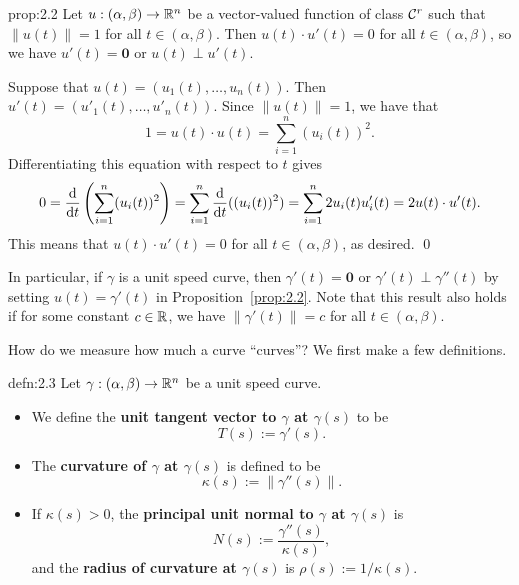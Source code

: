 \begin{prop}{prop:2.2}
    Let $u : (\alpha, \beta) \to \mathbb{R}^n$ be a vector-valued function of class ${\cal C}^r$ 
    such that $\|u(t)\| = 1$ for all $t \in (\alpha, \beta)$. Then 
    $u(t) \cdot u'(t) = 0$ for all $t \in (\alpha, \beta)$, so
    we have $u'(t) = \mathbf 0$ or $u(t) \perp u'(t)$.
\end{prop}\vspace{-0.25cm} 
\begin{pf}
    Suppose that $u(t) = (u_1(t), \dots, u_n(t))$. Then 
    $u'(t) = (u'_1(t), \dots, u'_n(t))$. Since $\|u(t)\| = 1$, we have that 
    \[ 1 = u(t) \cdot u(t) = \sum_{i=1}^n (u_i(t))^2. \]
    Differentiating this equation with respect to $t$ gives 
    \begin{align*}
        0 = \frac{\rm d}{{\rm d}t} \left( \sum_{i=1}^n (u_i(t))^2 \right)
        = \sum_{i=1}^n \frac{\rm d}{{\rm d}t} ((u_i(t))^2) 
        = \sum_{i=1}^n 2u_i(t)u'_i(t) = 2u(t) \cdot u'(t). 
    \end{align*}
    This means that $u(t) \cdot u'(t) = 0$ for all $t \in (\alpha, \beta)$, 
    as desired. \qed 
\end{pf}\vspace{-0.25cm} 

In particular, if $\gamma$ is a unit speed curve, then $\gamma'(t) = \mathbf 0$ 
or $\gamma'(t) \perp \gamma''(t)$ by setting $u(t) = \gamma'(t)$ in 
Proposition~\ref{prop:2.2}. Note that this result also holds if for 
some constant $c \in \mathbb{R}$, we have $\|\gamma'(t)\| = c$ for all $t \in (\alpha, \beta)$.

How do we measure how much a curve ``curves''? We first make a few definitions.

\begin{defn}{defn:2.3}
    Let $\gamma : (\alpha, \beta) \to \mathbb{R}^n$ be a unit speed curve. 
    \begin{itemize}
        \item We define the {\bf unit tangent vector to $\gamma$ at $\gamma(s)$} 
        to be 
        \[ T(s) := \gamma'(s). \] 
        \item The {\bf curvature of $\gamma$ at $\gamma(s)$} is defined to be 
        \[ \kappa(s) := \|\gamma''(s)\|. \] 
        \item If $\kappa(s) > 0$, the {\bf principal unit normal to $\gamma$ 
        at $\gamma(s)$} is 
        \[ N(s) := \frac{\gamma''(s)}{\kappa(s)}, \] 
        and the {\bf radius of curvature at $\gamma(s)$} is $\rho(s) := 1/\kappa(s)$. 
    \end{itemize}
\end{defn}


